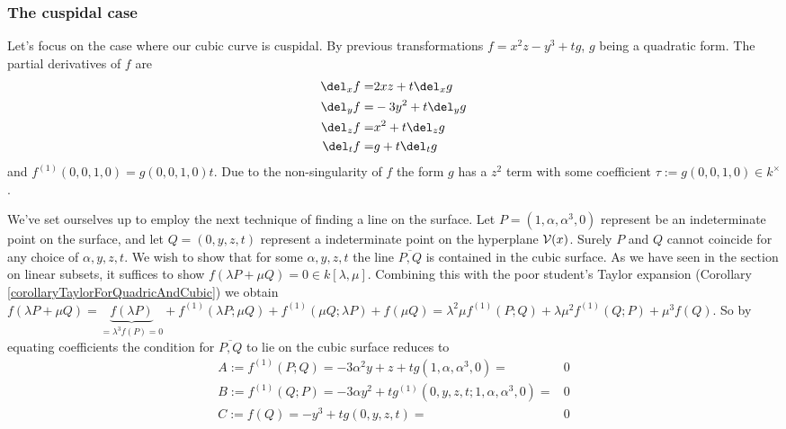 \subsubsection{The cuspidal case}
Let's focus on the case where our cubic curve is cuspidal. By previous transformations $f = x^2z - y^3 + tg$, $g$ being a quadratic form.
The partial derivatives of $f$ are
\begin{align}
   \del_x f =& 2xz + t\del_x g
\\ \del_y f =& -3y^2 + t\del_y g
\\ \del_z f =& x^2 + t\del_z g
\\ \del_t f =& g + t\del_t g
\end{align}
and $f^{(1)}(0,0,1,0) = g(0,0,1,0)t$.
Due to the non-singularity of $f$ the form $g$ has a $z^2$ term with some coefficient $\tau := g(0,0,1,0) \in k^\times$.

We've set ourselves up to employ the next technique of finding a line on the surface.
Let $P= (1,\alpha,\alpha^3,0)$ represent be an indeterminate point on the surface,
and let $Q = (0,y,z,t)$ represent a indeterminate point on the hyperplane $\operatorname{\mathcal V}(x)$.
Surely $P$ and $Q$ cannot coincide for any choice of $\alpha,y,z,t$.
We wish to show that for some $\alpha,y,z,t$ the line $\overline{P,Q}$ is contained in the cubic surface.
As we have seen in the section on linear subsets, it suffices to show $f(\lambda P + \mu Q) = 0 \in k[\lambda,\mu]$.
Combining this with the poor student's Taylor expansion (Corollary \ref{corollaryTaylorForQuadricAndCubic}) we obtain
$f(\lambda P + \mu Q)
= \underset{=\lambda^3 f(P) = 0}{\underbrace{f(\lambda P)}}
+ f^{(1)}(\lambda P;\mu Q)
+ f^{(1)}(\mu Q;\lambda P)
+ f(\mu Q)
= \lambda^2\mu f^{(1)}(P;Q)
+ \lambda\mu^2 f^{(1)}(Q;P)
+ \mu^3 f(Q)$.
So by equating coefficients the condition for $\overline{P,Q}$ to lie on the cubic surface reduces to
\begin{align}
A :=  f^{(1)}(P;Q) = -3\alpha^2 y + z + tg(1,\alpha,\alpha^3,0) =& 0 \\
B :=  f^{(1)}(Q;P) = -3\alpha y^2 + tg^{(1)}(0,y,z,t;1,\alpha,\alpha^3,0) =& 0 \\
C :=  f(Q)         = -y^3 + tg(0,y,z,t) =& 0
\end{align}

